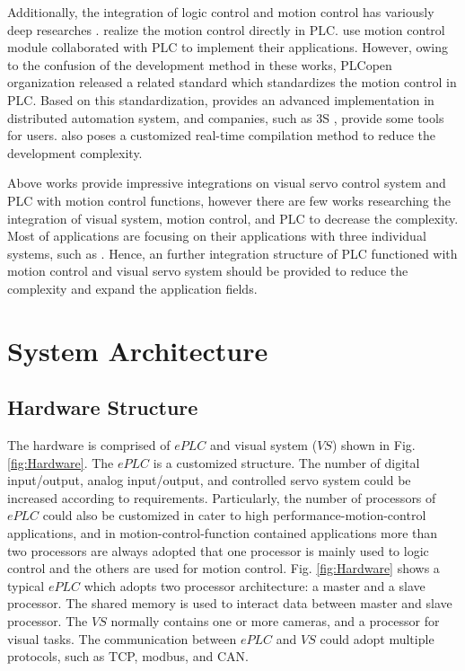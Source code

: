 \documentclass[journal,UTF8]{IEEEtran}
\begin{document}
Additionally, the integration of logic control and motion control has variously deep researches \cite{Ioannides2004Design,Shi2016The,Fang2017Design, syaichu2011model}. \cite{Ioannides2004Design,syaichu2011model} realize the motion control directly in PLC. \cite{Peng2011Linear, Qian2014A, OMRON2006CS1W} use motion control module collaborated with PLC to implement their applications. However, owing to the confusion of the development method in these works, PLCopen organization released a related standard \cite{PLCopen2005Function} which standardizes the motion control in PLC. Based on this standardization, \cite{S2006Advanced} provides an advanced implementation in distributed automation system, and companies, such as 3S \cite{3S2017Logic}, provide some tools for users. \cite{wu2018customized} also poses a customized real-time compilation method to reduce the development complexity.

Above works provide impressive integrations on visual servo control system and PLC with motion control functions, however there are few works researching the integration of visual system, motion control, and PLC to decrease the complexity. Most of applications are focusing on their applications with three individual systems, such as \cite{Chen2014A}. Hence, an further integration structure of PLC functioned with motion control and visual servo system should be provided to reduce the complexity and expand the application fields.



\section{System Architecture}
\label{SystemStructure}
\subsection{Hardware Structure}
The hardware is comprised of $ePLC$ and visual system ($VS$) shown in Fig.\ref{fig:Hardware}. The $ePLC$ is a customized structure. The number of digital input/output, analog input/output, and controlled servo system could be increased according to requirements. Particularly, the number of processors of $ePLC$ could also be customized in cater to high performance-motion-control applications, and in motion-control-function contained applications more than two processors are always adopted that one processor is mainly used to logic control and the others are used for motion control. Fig. \ref{fig:Hardware} shows a typical $ePLC$ which adopts two processor architecture: a master and a slave processor. The shared memory is used to interact data between master and slave processor. The $VS$ normally contains one or more cameras, and a processor for visual tasks. The communication between $ePLC$ and $VS$ could adopt multiple protocols, such as TCP, modbus, and CAN.
\end{document}
